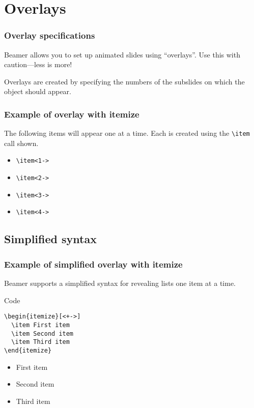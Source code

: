 \documentclass{beamer}
\begin{document}
\section{Overlays}
\begin{frame}
  \frametitle{Overlay specifications}
  Beamer allows you to set up animated slides using ``overlays''.
  Use this with caution---less is more!

  Overlays are created by specifying the numbers of the subslides on which the object should appear.
\end{frame}

\begin{frame}[fragile] %
  \frametitle{Example of overlay with itemize}
  The following items will appear one at a time.
  Each is created using the \verb|\item| call shown.
  \begin{itemize}
  \item<1-> \verb|\item<1->|
  \item<2-> \verb|\item<2->|
  \item<3-> \verb|\item<3->|
  \item<4-> \verb|\item<4->|
  \end{itemize}
\end{frame}

\subsection{Simplified syntax}
\begin{frame}[fragile]
  \frametitle{Example of simplified overlay with itemize}

  Beamer supports a simplified syntax for revealing lists one item at a time.
  \begin{block}{Code}
  \begin{verbatim}
\begin{itemize}[<+->]
  \item First item
  \item Second item
  \item Third item
\end{itemize}
  \end{verbatim}
  \end{block}

  \begin{itemize}[<+->]
    \item First item
    \item Second item
    \item Third item
  \end{itemize}
\end{frame}
\end{document}
